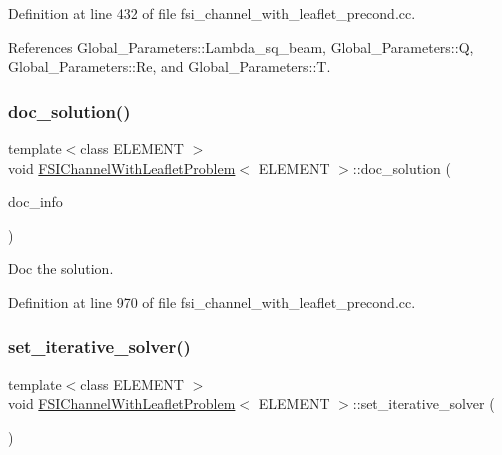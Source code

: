 Definition at line 432 of file fsi\+\_\+channel\+\_\+with\+\_\+leaflet\+\_\+precond.\+cc.



References Global\+\_\+\+Parameters\+::\+Lambda\+\_\+sq\+\_\+beam, Global\+\_\+\+Parameters\+::Q, Global\+\_\+\+Parameters\+::\+Re, and Global\+\_\+\+Parameters\+::T.

\mbox{\label{classFSIChannelWithLeafletProblem_adca46cd909199b5721b6e17c15caae02}} 
\subsubsection{\texorpdfstring{doc\+\_\+solution()}{doc\_solution()}}
{\footnotesize\ttfamily template$<$class E\+L\+E\+M\+E\+NT $>$ \\
void \hyperlink{classFSIChannelWithLeafletProblem}{F\+S\+I\+Channel\+With\+Leaflet\+Problem}$<$ E\+L\+E\+M\+E\+NT $>$\+::doc\+\_\+solution (\begin{DoxyParamCaption}\item[{Doc\+Info \&}]{doc\+\_\+info }\end{DoxyParamCaption})}



Doc the solution. 



Definition at line 970 of file fsi\+\_\+channel\+\_\+with\+\_\+leaflet\+\_\+precond.\+cc.

\mbox{\label{classFSIChannelWithLeafletProblem_a8ca939c0edc4194e4e5cb7d1404f27de}} 
\subsubsection{\texorpdfstring{set\+\_\+iterative\+\_\+solver()}{set\_iterative\_solver()}}
{\footnotesize\ttfamily template$<$class E\+L\+E\+M\+E\+NT $>$ \\
void \hyperlink{classFSIChannelWithLeafletProblem}{F\+S\+I\+Channel\+With\+Leaflet\+Problem}$<$ E\+L\+E\+M\+E\+NT $>$\+::set\+\_\+iterative\+\_\+solver (\begin{DoxyParamCaption}{ }\end{DoxyParamCaption})}



